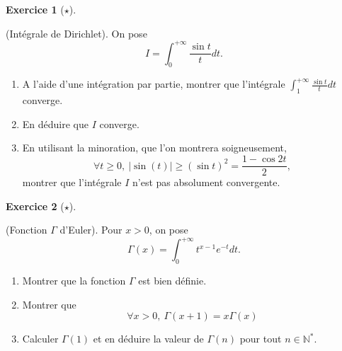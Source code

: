 \documentclass[
  french,
  letterpaper,
  DIV=11,
  numbers=noendperiod]{scrreprt}
\theoremstyle{plain}
\theoremstyle{definition}
\theoremstyle{plain}
\theoremstyle{plain}
\theoremstyle{definition}
\newtheorem{exercise}{Exercice}[chapter]
\theoremstyle{definition}
\theoremstyle{plain}
\theoremstyle{remark}
\begin{document}
\begin{exercise}[\(\star\)]\protect\hypertarget{exr-01-dirichlet}{}\label{exr-01-dirichlet}

(Intégrale de Dirichlet). On pose
\[I = \int_0^{+\infty}\frac{\sin t}{t}dt.\]

\begin{enumerate}
\def\labelenumi{\arabic{enumi}.}
\item
  A l'aide d'une intégration par partie, montrer que l'intégrale
  \(\int_{1}^{+\infty}\frac{\sin t}{t}dt\) converge.
\item
  En déduire que \(I\) converge.
\item
  En utilisant la minoration, que l'on montrera soigneusement,
  \[\forall t\geqslant 0,\ |\sin(t)|\geqslant (\sin t)^{2} = \frac{1-\cos 2t}{2},\]
  montrer que l'intégrale \(I\) n'est pas absolument convergente.
\end{enumerate}

\end{exercise}

\begin{exercise}[\(\star\)]\protect\hypertarget{exr-01-gamma}{}\label{exr-01-gamma}

(Fonction \(\Gamma\) d'Euler). Pour \(x>0\), on pose
\[\Gamma(x)= \int_0^{+\infty}t^{x-1}e^{-t}dt.\]

\begin{enumerate}
\def\labelenumi{\arabic{enumi}.}
\item
  Montrer que la fonction \(\Gamma\) est bien définie.
\item
  Montrer que \[\forall x>0,\ \Gamma(x+1) = x\Gamma(x)\]
\item
  Calculer \(\Gamma(1)\) et en déduire la valeur de \(\Gamma(n)\) pour
  tout \(n\in\mathbb{N}^*\).
\end{enumerate}

\end{exercise}
\end{document}
